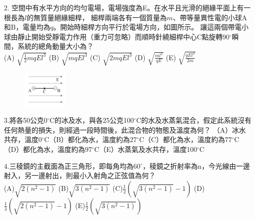 \documentclass[cn,10pt,math=newtx]{elegantbook}
\begin{document}
\begin{example}
  2.	空間中有水平方向的均勻電場，電場強度為E。在水平且光滑的絕緣平面上有一根長為$l$的無質量絕緣細桿，
  細桿兩端各有一個質量為$m$、帶等量異性電的小球A和B，電量均為$q$。開始時細桿方向平行於電場方向，如圖所示。
  讓這兩個帶電小球由靜止開始受靜電力作用（重力可忽略）而順時針繞細桿中心C點旋轉90$^\circ$瞬間，系統的總角動量大小為？\\
  (A) $\sqrt{\frac{1}{2} mqE l^3}$ (B) $\sqrt{mq E l^3}$ (C) $\sqrt{2mqE l^3}$ (D) $\sqrt{\frac{m l^3}{qE}}$ (E) $\sqrt{\frac{qE l^3}{2m}}$ \\
  \rightline{[成德高中教甄109]}
\end{example}
\begin{solution}
  
\end{solution}
\begin{figure}[htbp]
    \flushright
    \includegraphics[width=0.2\textwidth]{image/109成德2.png}
\end{figure}

\newpage



\begin{example}
   3.將各50公克0$^\circ$C的冰及水，與各25公克100$^\circ$C的水及水蒸氣混合，假定此系統沒有任何熱量的損失，則經過一段時間後，此混合物的物態及溫度為何？
   （A）冰水共存，溫度0$^\circ$C（B）都化為水，溫度約為27$^\circ$C（C）都化為水，溫度約為77$^\circ$C（D）都化為水，溫度約為97$^\circ$C（E）水蒸氣及水共存，溫度100$^\circ$C
   \\
    \rightline{[成德高中教甄109]}
\end{example}
\begin{solution}
    
\end{solution}

\newpage


\begin{example}
   4.三稜鏡的主截面為正三角形，即每角均為60$^\circ$，稜鏡之折射率為n，今光線由一邊射入，另一邊射出，則最小入射角之正弦值為何？\\
   (A)$\sqrt{2 (n^2 - 1)}$ (B)$\sqrt{3 (n^2 - 1)}$ (C)$\frac{1}{2} (\sqrt{3 (n^2 - 1)}-1)$ (D)$\frac{1}{3} (\sqrt{2 (n^2 - 1)}-1)$ (E)$\frac{1}{2} (\sqrt{3 (n^2 - 1)})$
   \\
    \rightline{[成德高中教甄109]}
\end{example}
\begin{solution}
    
\end{solution}
\end{document}
